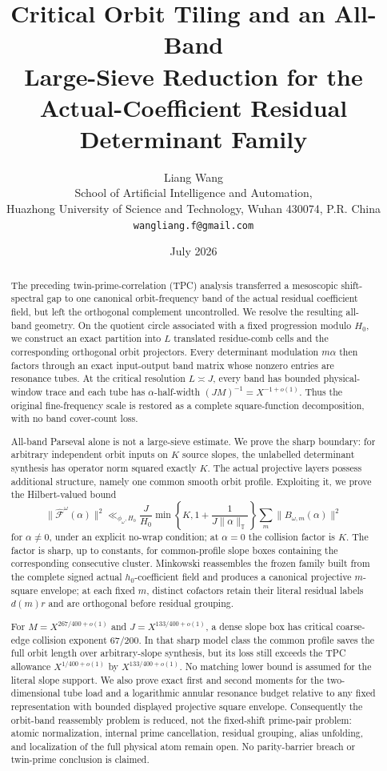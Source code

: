 \documentclass[11pt]{article}
\title{\bfseries Critical Orbit Tiling and an All-Band\\
Large-Sieve Reduction for the\\
Actual-Coefficient Residual Determinant Family}
\author{Liang Wang\\
\small School of Artificial Intelligence and Automation,\\[-2pt]
\small Huazhong University of Science and Technology, Wuhan 430074, P.R. China\\
\small \texttt{wangliang.f@gmail.com}}
\date{July 2026}
\theoremstyle{definition}
\theoremstyle{remark}
\newcommand{\cF}{\mathcal F}
\begin{document}
\maketitle

\begin{abstract}
The preceding twin-prime-correlation (TPC) analysis transferred a
mesoscopic shift-spectral gap to one canonical orbit-frequency band of
the actual residual coefficient field, but left the orthogonal
complement uncontrolled.  We resolve the resulting all-band geometry.
On the quotient circle associated with a fixed progression modulo
\(H_0\), we construct an exact partition into \(L\) translated
residue-comb cells and the corresponding orthogonal orbit projectors.
Every determinant modulation \(m\alpha\) then factors through an exact
input-output band matrix whose nonzero entries are resonance tubes.
At the critical resolution \(L\asymp J\), every band has bounded
physical-window trace and each tube has \(\alpha\)-half-width
\((JM)^{-1}=X^{-1+o(1)}\).  Thus the original fine-frequency scale is
restored as a complete square-function decomposition, with no band
cover-count loss.

All-band Parseval alone is not a large-sieve estimate.  We prove the
sharp boundary: for arbitrary independent orbit inputs on \(K\) source
slopes, the unlabelled determinant synthesis has operator norm squared
exactly \(K\).  The actual projective layers possess additional
structure, namely one common smooth orbit profile.  Exploiting it, we
prove the Hilbert-valued bound
\[
 \|\widehat{\cF}^{\omega}(\alpha)\|^2
 \ll_{\phi_\omega,H_0}
 \frac{J}{H_0}
 \min\!\left\{K,1+\frac1{J\|\alpha\|_{\mathbb T}}\right\}
 \sum_m\|B_{\omega,m}(\alpha)\|^2
\]
for \(\alpha\ne0\), under an explicit no-wrap condition; at
\(\alpha=0\) the collision factor is \(K\).  The factor is sharp,
up to constants, for common-profile slope boxes containing the
corresponding consecutive cluster.  Minkowski reassembles the frozen
family built from the complete signed actual \(h_0\)-coefficient field
and produces a canonical projective \(m\)-square envelope; at each fixed \(m\),
distinct cofactors retain their literal residual labels \(d(m)r\) and
are orthogonal before residual grouping.

For \(M=X^{267/400+o(1)}\) and
\(J=X^{133/400+o(1)}\), a dense slope box has critical coarse-edge
collision exponent \(67/200\).  In that sharp model class the common
profile saves the full orbit length over arbitrary-slope synthesis,
but its loss still exceeds the TPC allowance \(X^{1/400+o(1)}\) by
\(X^{133/400+o(1)}\).  No matching lower bound is assumed for the
literal slope support.  We also prove exact first and second moments
for the two-dimensional tube load and a logarithmic annular resonance
budget relative to any fixed representation with bounded displayed
projective square envelope.
Consequently the orbit-band reassembly problem is reduced, not the
fixed-shift prime-pair problem: atomic normalization, internal prime
cancellation, residual grouping, alias unfolding, and localization of
the full physical atom remain open.  No parity-barrier breach or
twin-prime conclusion is claimed.
\end{abstract}
\end{document}
